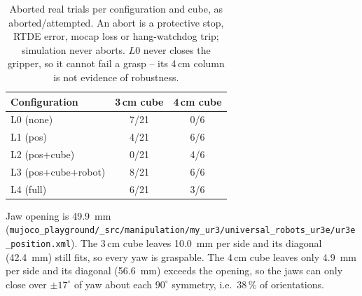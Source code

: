 \begin{table}[h]
\centering
\caption{Aborted real trials per configuration and cube, as aborted/attempted. An abort is a protective stop, RTDE error, mocap loss or hang-watchdog trip; simulation never aborts. $L0$ never closes the gripper, so it cannot fail a grasp -- its 4\,cm column is not evidence of robustness.}
\label{tab:abort}
\begin{tabular}{lcc}
\hline
\textbf{Configuration} & \textbf{3\,cm cube} & \textbf{4\,cm cube} \\
\hline
L0 (none) & 7/21 & 0/6 \\
L1 (pos) & 4/21 & 6/6 \\
L2 (pos+cube) & 0/21 & 4/6 \\
L3 (pos+cube+robot) & 8/21 & 6/6 \\
L4 (full) & 6/21 & 3/6 \\
\hline
\end{tabular}

\vspace{2pt}
\begin{minipage}{0.95\linewidth}
\footnotesize Jaw opening is 49.9~mm (\texttt{mujoco\_playground/\_src/manipulation/my\_ur3/universal\_robots\_ur3e/ur3e\_position.xml}). The 3\,cm cube leaves 10.0~mm per side and its diagonal (42.4~mm) still fits, so every yaw is graspable. The 4\,cm cube leaves only 4.9~mm per side and its diagonal (56.6~mm) exceeds the opening, so the jaws can only close over $\pm17^\circ$ of yaw about each $90^\circ$ symmetry, i.e.\ 38\,\% of orientations.
\end{minipage}
\end{table}
